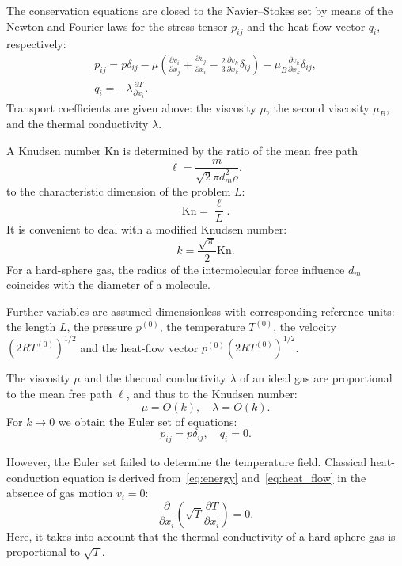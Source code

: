 \documentclass[smallextended, referee]{svjour3} %
\newcommand{\Kn}{\mathrm{Kn}}
\newcommand{\pder}[2][]{\frac{\partial#1}{\partial#2}}
\begin{document}
The conservation equations are closed to the Navier--Stokes set by means of the Newton and Fourier laws
for the stress tensor \(p_{ij}\) and the heat-flow vector \(q_i\), respectively:
\begin{gather}
	p_{ij} = p\delta_{ij} - \mu\left(\pder[v_i]{x_j}+\pder[v_j]{x_i}-\frac23\pder[v_k]{x_k}\delta_{ij}\right) -
		\mu_B\pder[v_k]{x_k}\delta_{ij}, \label{eq:stress_tensor}\\
	q_i = -\lambda\pder[T]{x_i}. \label{eq:heat_flow}
\end{gather}
Transport coefficients are given above:
the viscosity \(\mu\), the second viscosity \(\mu_B\), and the thermal conductivity \(\lambda\).

A Knudsen number \(\Kn\) is determined by the ratio of the mean free path
\begin{equation}\label{eq:ell}
	\ell = \frac{m}{\sqrt2\pi d_m^2 \rho}.
\end{equation}
to the characteristic dimension of the problem \(L\):
\begin{equation}\label{eq:Knudsen}
	\Kn = \frac{\ell}L.
\end{equation}
It is convenient to deal with a modified Knudsen number:
\begin{equation}
	k = \frac{\sqrt\pi}2\Kn.
\end{equation}
For a hard-sphere gas, the radius of the intermolecular force influence \(d_m\)
coincides with the diameter of a molecule.

Further variables are assumed dimensionless with corresponding reference units:
the length \(L\), the pressure \(p^{(0)}\), the temperature \(T^{(0)}\),
the velocity \((2RT^{(0)})^{1/2}\) and the heat-flow vector \(p^{(0)}(2RT^{(0)})^{1/2}\).

The viscosity \(\mu\) and the thermal conductivity \(\lambda\) of an ideal gas
are proportional to the mean free path \(\ell\), and thus to the Knudsen number:
\begin{equation}
	\mu = O(k), \quad \lambda = O(k).
\end{equation}
For \(k\to0\) we obtain the Euler set of equations:
\begin{equation}
	p_{ij} = p\delta_{ij}, \quad q_i = 0.
\end{equation}

However, the Euler set failed to determine the temperature field.
Classical heat-conduction equation is derived from~\eqref{eq:energy} and~\eqref{eq:heat_flow}
in the absence of gas motion \(v_i = 0\):
\begin{equation}\label{eq:heat_equation}
	\pder{x_i}\left(\sqrt{T}\pder[T]{x_i}\right) = 0.
\end{equation}
Here, it takes into account that the thermal conductivity of a hard-sphere gas is proportional to \(\sqrt{T}\).
\end{document}
